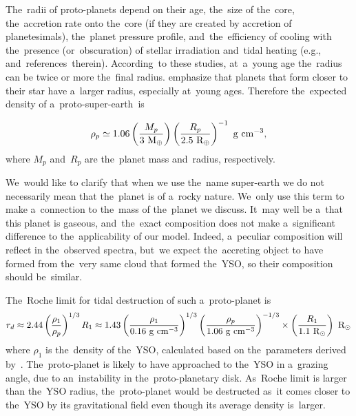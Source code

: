 \documentclass[galaxies,article,accept,moreauthors,pdftex]{mdpi}
\def \sun{\odot}
\def \rmRodot{~\rm{R_{\sun}}}
\def \rmME{~\rm{M_{\oplus}}}
\def \rmRE{~\rm{R_{\oplus}}}
\begin{document}
The~radii of proto-planets depend on their age, the~size of the~core, the~accretion rate onto the~core (if they are created by accretion of planetesimals), the~planet pressure profile, and~the~efficiency of cooling with the~presence (or~obscuration) of stellar irradiation and~tidal heating (e.g., \cite{Baruteauetal2016, Fortneyetal2007, Guillot2005} and~references~therein). According~to these studies, at~a~young age the~radius can be twice or more the~final radius. \cite{Fortneyetal2007} emphasize that planets that form closer to their star have a~larger radius, especially at~young ages.
Therefore the~expected density of a~proto-super-earth~is

\begin{equation}
\rho_p \simeq 1.06
\left(\frac{M_p}{3 \rmME}\right)
\left(\frac{R_p}{2.5 \rmRE}\right)^{-1}~\rm{g~cm^{-3}}, %
\label{eq:rho_p}
\end{equation}
where $M_p$ and~$R_p$ are the~planet mass and~radius, respectively.

We~would like to clarify that when we use the~name super-earth we do not necessarily mean that the~planet is of a~rocky nature. We~only use this term to make a~connection to the~mass of the~planet we discuss. It~may well be a~that this planet is gaseous, and~the~exact composition does not make a~significant difference to the~applicability of our model. Indeed, a~peculiar composition will reflect in the~observed spectra, but~we expect the~accreting object to have formed from the~very same cloud that formed the~YSO, so their composition should be~similar. 

The~Roche limit for tidal destruction of such a~proto-planet is
\begin{equation}
r_d \approx 2.44 \left( \frac{\rho_1}{\rho_p} \right)^{1/3} R_1
\approx 1.43
\left(\frac{\rho_1}{0.16~\rm{g~cm^{-3}}}\right)^{1/3}
\left(\frac{\rho_p}{1.06~\rm{g~cm^{-3}}}\right)^{-1/3}
\times \left(\frac{R_1}{1.1 \rmRodot}\right) \rmRodot \\ %
\label{eq:r_d}
\end{equation}
where $\rho_1$ is the~density of the~YSO, calculated based on the~parameters derived by~\citep{SiciliaAguilaretal2017}. The~proto-planet is likely to have approached to the~YSO in a~grazing angle, due to an~instability in the~proto-planetary disk. As~Roche limit is larger than the~YSO radius, the~proto-planet would be destructed as~it comes closer to the~YSO by its gravitational field even though its average density is~larger.
\end{document}
